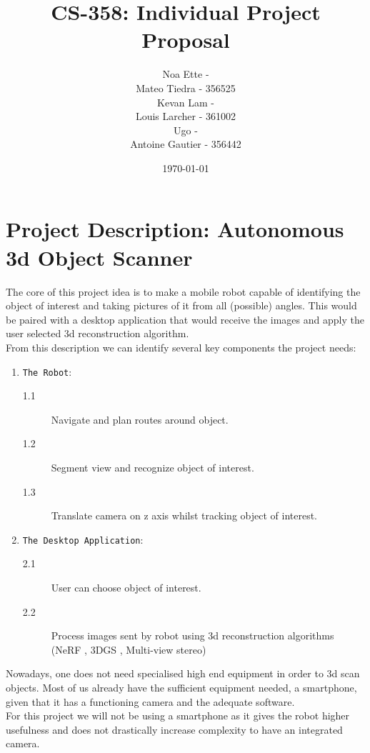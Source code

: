 \documentclass{article}
\title{CS-358: Individual Project Proposal}
\author{Noa Ette - \\Mateo Tiedra - 356525\\Kevan Lam - \\Louis Larcher - 361002\\Ugo - \\Antoine Gautier - 356442}
\date{\today}
\begin{document}
\maketitle
\vspace{45mm}
\tableofcontents
\newpage
\section{Project Description: Autonomous 3d Object Scanner}

The core of this project idea is to make a mobile robot capable of identifying the object of interest and taking pictures of it from all (possible) angles. 
This would be paired with a desktop application that would receive the images and apply the user selected 3d reconstruction algorithm.\\


From this description we can identify several key components the project needs: \begin{enumerate}
    \item \texttt{The Robot}:
    \begin{description}
            \item[1.1] Navigate and plan routes around object.
            \item[1.2] Segment view and recognize object of interest.
            \item[1.3] Translate camera on z axis whilst tracking object of interest.
    \end{description}
    \item \texttt{The Desktop Application}:
    \begin{description}
        \item[2.1] User can choose object of interest.
        \item[2.2] Process images sent by robot using 3d reconstruction algorithms (NeRF \cite{mildenhall2020nerf}, 3DGS \cite{kerbl3Dgaussians}, Multi-view stereo)
    \end{description}
\end{enumerate}

Nowadays, one does not need specialised high end equipment in order to 3d scan objects. Most of us already have the sufficient equipment needed, a smartphone, given that it has a functioning camera and the adequate software. \\
For this project we will not be using a smartphone as it gives the robot higher usefulness and does not drastically increase complexity to have an integrated camera. 
\end{document}
